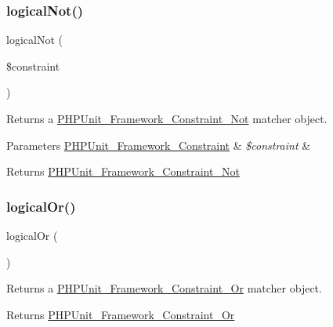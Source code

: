 \subsubsection{\texorpdfstring{logical\+Not()}{logicalNot()}}
{\footnotesize\ttfamily logical\+Not (\begin{DoxyParamCaption}\item[{\mbox{\hyperlink{class_p_h_p_unit___framework___constraint}{P\+H\+P\+Unit\+\_\+\+Framework\+\_\+\+Constraint}}}]{\$constraint }\end{DoxyParamCaption})}

Returns a \mbox{\hyperlink{class_p_h_p_unit___framework___constraint___not}{P\+H\+P\+Unit\+\_\+\+Framework\+\_\+\+Constraint\+\_\+\+Not}} matcher object.


\begin{DoxyParams}[1]{Parameters}
\mbox{\hyperlink{class_p_h_p_unit___framework___constraint}{P\+H\+P\+Unit\+\_\+\+Framework\+\_\+\+Constraint}} & {\em \$constraint} & \\
\hline
\end{DoxyParams}
\begin{DoxyReturn}{Returns}
\mbox{\hyperlink{class_p_h_p_unit___framework___constraint___not}{P\+H\+P\+Unit\+\_\+\+Framework\+\_\+\+Constraint\+\_\+\+Not}} 
\end{DoxyReturn}
\mbox{\label{_functions_8php_a9765b90f16412c9210fe50cc301eb9af}} 
\subsubsection{\texorpdfstring{logical\+Or()}{logicalOr()}}
{\footnotesize\ttfamily logical\+Or (\begin{DoxyParamCaption}{ }\end{DoxyParamCaption})}

Returns a \mbox{\hyperlink{class_p_h_p_unit___framework___constraint___or}{P\+H\+P\+Unit\+\_\+\+Framework\+\_\+\+Constraint\+\_\+\+Or}} matcher object.

\begin{DoxyReturn}{Returns}
\mbox{\hyperlink{class_p_h_p_unit___framework___constraint___or}{P\+H\+P\+Unit\+\_\+\+Framework\+\_\+\+Constraint\+\_\+\+Or}} 
\end{DoxyReturn}
\mbox{\label{_functions_8php_ab864cff8b3135268437a09c54fab34ee}} 
